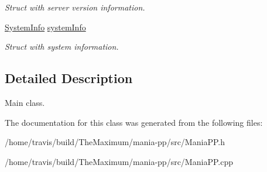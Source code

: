 \begin{DoxyCompactItemize}
\begin{DoxyCompactList}\small\item\em Struct with server version information. \end{DoxyCompactList}\item 
\hypertarget{classManiaPP_aa81f571a6c007f2b7cf26101d9c23a3d}{\hyperlink{structSystemInfo}{System\-Info} \hyperlink{classManiaPP_aa81f571a6c007f2b7cf26101d9c23a3d}{system\-Info}}\label{classManiaPP_aa81f571a6c007f2b7cf26101d9c23a3d}

\begin{DoxyCompactList}\small\item\em Struct with system information. \end{DoxyCompactList}\end{DoxyCompactItemize}


\subsection{Detailed Description}
Main class. 

The documentation for this class was generated from the following files\-:\begin{DoxyCompactItemize}
\item 
/home/travis/build/\-The\-Maximum/mania-\/pp/src/Mania\-P\-P.\-h\item 
/home/travis/build/\-The\-Maximum/mania-\/pp/src/Mania\-P\-P.\-cpp\end{DoxyCompactItemize}
